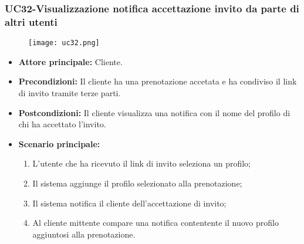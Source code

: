 \pagebreak
\subsubsection{UC32-Visualizzazione notifica accettazione invito da parte di altri utenti}
\begin{figure}[h] \texttt{[image: uc32.png]} \end{figure}
\begin{itemize}
\item \textbf{Attore principale:} Cliente.
\item \textbf{Precondizioni:} Il cliente ha una prenotazione accetata e ha condiviso il link di invito tramite terze parti.
\item \textbf{Postcondizioni:} Il cliente visualizza una notifica con il nome del profilo di chi ha accettato l'invito.
\item \textbf{Scenario principale:}
\begin{enumerate}
    \item L'utente che ha ricevuto il link di invito seleziona un profilo;
    \item Il sistema aggiunge il profilo selezionato alla prenotazione;
    \item Il sistema notifica il cliente dell'accettazione di invito;
    \item Al cliente mittente compare una notifica contentente il nuovo profilo aggiuntosi alla prenotazione.
\end{enumerate}
\end{itemize}
